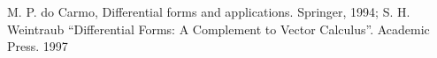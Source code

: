 \documentclass[12pt]{article}
\theoremstyle{definition}
\begin{document}
\tableofcontents

\newpage

\newpage

\newpage

\newpage

\newpage

\newpage

\newpage

\newpage

\newpage

\newpage

\newpage

\newpage


\begin{thebibliography}{99}
	 M. P. do Carmo, Differential forms and applications. Springer, 1994;
	 S. H. Weintraub “Differential Forms: A Complement to Vector Calculus”. Academic Press. 1997
\end{thebibliography}
\end{document}
